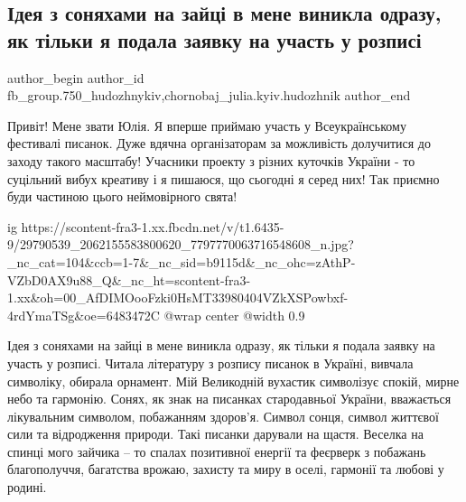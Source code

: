  
 
 
 
 

\subsection{Ідея з соняхами на зайці в мене виникла одразу, як тільки я подала заявку на участь у розписі}
\label{sec:05_04_2018.fb.fb_group.750_hudozhnykiv.2.zajec_sonjahy}
 
\ifcmt
 author_begin
   author_id fb_group.750_hudozhnykiv,chornobaj_julia.kyiv.hudozhnik
 author_end
\fi

Привіт! Мене звати Юлія. Я вперше приймаю участь у Всеукраїнському фестивалі
писанок. Дуже вдячна організаторам за можливість долучитися до заходу такого
масштабу! Учасники проекту з різних куточків України - то суцільний вибух
креативу і я пишаюся, що сьогодні я серед них! Так приємно буди частиною цього
неймовірного свята!

\ifcmt
  ig https://scontent-fra3-1.xx.fbcdn.net/v/t1.6435-9/29790539_2062155583800620_7797770063716548608_n.jpg?_nc_cat=104&ccb=1-7&_nc_sid=b9115d&_nc_ohc=zAthP-VZbD0AX9u88_Q&_nc_ht=scontent-fra3-1.xx&oh=00_AfDIMOooFzki0HsMT33980404VZkXSPowbxf-4rdYmaTSg&oe=6483472C
  @wrap center
  @width 0.9
\fi

Ідея з соняхами на зайці в мене виникла одразу, як тільки я подала заявку на
участь у розписі. Читала літературу з розпису писанок в Україні, вивчала
символіку, обирала орнамент. Мій Великодній вухастик символізує спокій, мирне
небо та гармонію.  Сонях, як знак на писанках стародавньої України, вважається
лікувальним символом, побажанням здоров'я. Символ сонця, символ життєвої сили
та відродження природи. Такі писанки дарували на щастя. Веселка на спинці мого
зайчика – то спалах позитивної енергії та феєрверк з побажань благополуччя,
багатства врожаю, захисту та миру в оселі, гармонії та любові у родині.

